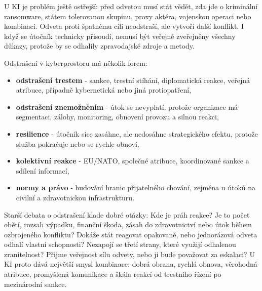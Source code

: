 U KI je problém ještě ostřejší: před odvetou musí stát vědět, zda jde o kriminální ransomware, státem tolerovanou skupinu, proxy aktéra, vojenskou operaci nebo kombinaci. Odveta proti špatnému cíli neodstraší, ale vytvoří další konflikt. I když se útočník technicky přisoudí, nemusí být veřejně zveřejněny všechny důkazy, protože by se odhalily zpravodajské zdroje a metody.

Odstrašení v kyberprostoru má několik forem:
\begin{itemize}
  \item \textbf{odstrašení trestem} - sankce, trestní stíhání, diplomatická reakce, veřejná atribuce, případně kybernetická nebo jiná protiopatření,
  \item \textbf{odstrašení znemožněním} - útok se nevyplatí, protože organizace má segmentaci, zálohy, monitoring, obnovení provozu a silnou reakci,
  \item \textbf{resilience} - útočník sice zasáhne, ale nedosáhne strategického efektu, protože služba pokračuje nebo se rychle obnoví,
  \item \textbf{kolektivní reakce} - EU/NATO, společné atribuce, koordinované sankce a sdílení informací,
  \item \textbf{normy a právo} - budování hranic přijatelného chování, zejména u útoků na civilní a zdravotnickou infrastrukturu.
\end{itemize}

Starší debata o odstrašení klade dobré otázky: Kde je práh reakce? Je to počet obětí, rozsah výpadku, finanční škoda, zásah do zdravotnictví nebo útok během ozbrojeného konfliktu? Dokáže stát reagovat opakovaně, nebo jednorázová odveta odhalí vlastní schopnosti? Nezapojí se třetí strany, které využijí odhalenou zranitelnost? Přijme veřejnost sílu odvety, nebo ji bude považovat za eskalaci? U KI proto dává největší smysl kombinace: dobrá obrana, rychlá obnova, věrohodná atribuce, promyšlená komunikace a škála reakcí od trestního řízení po mezinárodní sankce.



